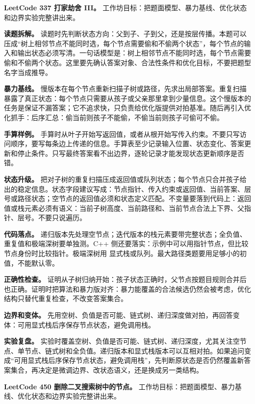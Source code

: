 \noindent\textbf{LeetCode 337 打家劫舍 III。} 工作坊目标：把题面模型、暴力基线、优化状态和边界实验完整讲出来。

\textbf{读题拆解。} 读题时先判断状态方向：父到子、子到父，还是按层传播。本题可以压成“树上相邻节点不能同时选，每个节点需要偷和不偷两个状态”，每个节点的输入和输出状态必须写清。一句话模型是：树上相邻节点不能同时选，每个节点需要偷和不偷两个状态。这里要先确认答案对象、合法性条件和优化目标，不要把题型名字当成推导。

\textbf{暴力基线。} 慢版本在每个节点重新扫描子树或路径，先求出局部答案。重复扫描暴露了真正状态：每个节点只需要从孩子或父亲那里拿到少量信息。这个慢版本的任务是保证不漏答案；它不追求快，只负责给优化版提供对拍基准。随后再引入优化抓手：后序汇总：偷当前则孩子不能偷，不偷当前则孩子可偷可不偷。

\textbf{手算样例。} 手算时从叶子开始写返回值，或者从根开始写传入约束。不要只写访问顺序，要写每条边上传递的信息。手算表至少记录输入位置、状态变化、答案更新和停止条件。只写最终答案看不出边界，逐轮记录才能发现状态更新顺序是否错。

\textbf{状态升级。} 把对子树的重复扫描压成返回值或队列状态；每个节点只合并孩子给出的稳定信息。状态字段建议写成：节点指针、传入约束或返回值、当前答案、层号或路径状态；空节点的返回值必须和状态定义匹配。不变量要落到代码上：返回值或栈元素必须有语义：当前子树高度、当前路径和、当前节点合法上下界、父指针、层号。不要只说遍历。

\textbf{代码落点。} 递归版本先处理空节点；迭代版本的栈元素要带完整状态；全负值、重复值和极端深树要单独测。C++ 侧还要落实：示例中可以用指针节点，但比较节点身份时比较指针。极端深树用  显式栈或队列。最大路径类题要用足够小的初值，不能默认零。

\textbf{正确性检查。} 证明从子树归纳开始：孩子状态正确时，父节点按题目规则合并后也正确。证明时把算法和暴力版对齐：暴力能覆盖的合法候选仍然会被考虑，优化结构只替代重复检查，不改变答案集合。

\textbf{边界和变体。} 先用空树、负值是否可能、链式树、递归深度做对拍，再回答变体：可用显式栈后序保存节点状态，避免调用栈。

\textbf{实验复盘。} 实验时覆盖空树、负值是否可能、链式树、递归深度，尤其关注空节点、单节点、链式树和全负值。递归版本和显式栈版本可以互相对拍。如果追问变成“可用显式栈后序保存节点状态，避免调用栈”，先判断原状态是否仍然覆盖新答案集合，再决定是微调边界、改状态语义，还是换成另一类结构。

\noindent\textbf{LeetCode 450 删除二叉搜索树中的节点。} 工作坊目标：把题面模型、暴力基线、优化状态和边界实验完整讲出来。

